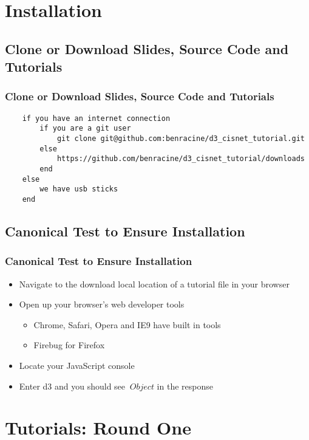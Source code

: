 \documentclass{beamer}
\begin{document}
\section{Installation}

\subsection{Clone or Download Slides, Source Code and Tutorials}

\begin{frame}[fragile]
    \frametitle{Clone or Download Slides, Source Code and Tutorials}
        \tiny{
        \begin{verbatim}
    if you have an internet connection
        if you are a git user
            git clone git@github.com:benracine/d3_cisnet_tutorial.git
        else
            https://github.com/benracine/d3_cisnet_tutorial/downloads
        end
    else
        we have usb sticks
    end
        \end{verbatim}
        }
\end{frame}



\subsection{Canonical Test to Ensure Installation}

\begin{frame}
    \frametitle{Canonical Test to Ensure Installation}
    \begin{itemize}
\pause
    \item Navigate to the download local location of a tutorial file in your browser
\pause
    \item Open up your browser's web developer tools
        \begin{itemize}
        \item Chrome, Safari, Opera and IE9 have built in tools
        \item Firebug for Firefox
        \end{itemize}
\pause
    \item Locate your JavaScript console
\pause
    \item Enter d3 and you should see $\> Object $ in the response
\pause
    \end{itemize}
\end{frame}




\section{Tutorials: Round One}
\end{document}
